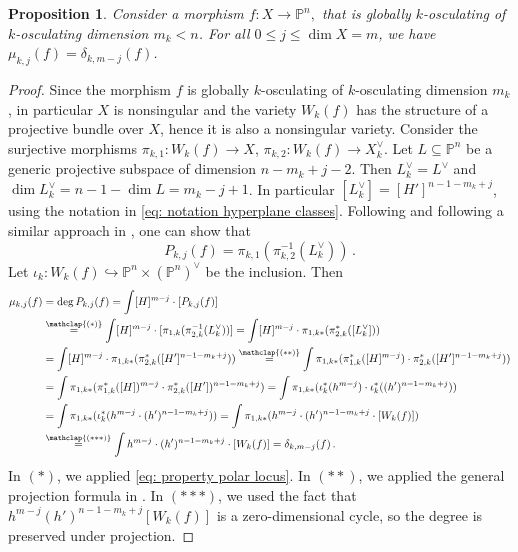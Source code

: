 \documentclass[11pt,reqno]{amsart}
\numberwithin{equation}{section}
\theoremstyle{plain}
\numberwithin{theorem}{section}
\newtheorem{proposition}[theorem]{Proposition}
\theoremstyle{definition}
\renewcommand{\P}{\mathbb{P}}
\begin{document}
\begin{proposition}\label{prop: properties kth polar degrees}
Consider a morphism $f\colon X\to\P^n,$ that is globally $k$-osculating of $k$-osculating dimension $m_k<n$. For all $0\le j\le \dim X=m$, we have $\mu_{k,j}(f)=\delta_{k,m-j}(f)$.
\end{proposition}
\begin{proof}
Since the morphism $f$ is globally $k$-osculating of $k$-osculating dimension $m_k$, in particular $X$ is nonsingular and the variety $W_k(f)$ has the structure of a projective bundle over $X$, hence it is also a nonsingular variety.
Consider the surjective morphisms $\pi_{k,1}\colon W_k(f)\to X$, $\pi_{k,2}\colon W_k(f)\to X_k^\vee$. Let $L\subseteq\P^n$ be a generic projective subspace of dimension $n-m_k+j-2$. Then $L_k^\vee=L^\vee$ and $\dim L_k^\vee=n-1-\dim L=m_k-j+1$. In particular $[L_k^\vee]=[H']^{n-1-m_k+j}$, using the notation in \eqref{eq: notation hyperplane classes}.
Following \cite[Proposition 3.4]{piene2022higher} and following a similar approach in \cite[Lemma 3.24]{dirocco2024Relative}, one can show that
\begin{equation}\label{eq: property polar locus}
    P_{k,j}(f)=\pi_{k,1}(\pi_{k,2}^{-1}(L_k^\vee))\,.
\end{equation}
Let $\iota_k\colon W_k(f)\hookrightarrow\P^n\times(\P^n)^\vee$ be the inclusion. Then
\begin{align*}
\mu_{k,j}(f) &= \deg P_{k,j}(f) = \int [H]^{m-j}\cdot[P_{k,j}(f)]\\
&\stackrel{\mathclap{(*)}}{=} \int [H]^{m-j}\cdot[\pi_{1,k}(\pi_{2,k}^{-1}(L_k^\vee))] = \int [H]^{m-j}\cdot \pi_{1,k*}(\pi_{2,k}^*([L_k^\vee]))\\
&= \int [H]^{m-j}\cdot \pi_{1,k*}(\pi_{2,k}^*([H']^{n-1-m_k+j}))\stackrel{\mathclap{(**)}}{=} \int \pi_{1,k*}(\pi_{1,k}^*([H]^{m-j})\cdot\pi_{2,k}^*([H']^{n-1-m_k+j}))\\
&= \int \pi_{1,k*}(\pi_{1,k}^*([H])^{m-j}\cdot\pi_{2,k}^*([H'])^{n-1-m_k+j}) = \int \pi_{1,k*}(\iota_k^*(h^{m-j})\cdot \iota_k^*((h')^{n-1-m_k+j}))\\
&= \int \pi_{1,k*}(\iota_k^*(h^{m-j}\cdot (h')^{n-1-m_k+j})) = \int \pi_{1,k*}(h^{m-j}\cdot (h')^{n-1-m_k+j}\cdot[W_k(f)])\\
&\stackrel{\mathclap{(***)}}{=} \int h^{m-j}\cdot (h')^{n-1-m_k+j}\cdot[W_k(f)] = \delta_{k,m-j}(f)\,.
\end{align*}
In $(*)$, we applied \eqref{eq: property polar locus}. In $(**)$, we applied the general projection formula in \cite[Theorem 3.2]{fulton1998intersection}. In $(***)$, we used the fact that $h^{m-j}(h')^{n-1-m_k+j}[W_k(f)]$ is a zero-dimensional cycle, so the degree is preserved under projection.
\end{proof}
\end{document}
